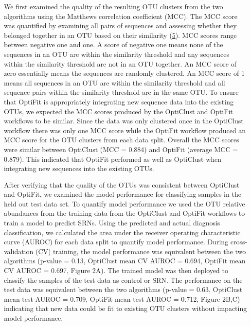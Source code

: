 \documentclass[
]{article}
\begin{document}
We first examined the quality of the resulting OTU clusters from the two
algorithms using the Matthews correlation coefficient (MCC). The MCC
score was quantified by examining all pairs of sequences and assessing
whether they belonged together in an OTU based on their similarity
(\protect\hyperlink{ref-westcott2017}{5}). MCC scores range between
negative one and one. A score of negative one means none of the
sequences in an OTU are within the similarity threshold and any
sequences within the similarity threshold are not in an OTU together. An
MCC score of zero essentially means the sequences are randomly
clustered. An MCC score of 1 means all sequences in an OTU are within
the similarity threshold and all sequence pairs within the similarity
threshold are in the same OTU. To ensure that OptiFit is appropriately
integrating new sequence data into the existing OTUs, we expected the
MCC scores produced by the OptiClust and OptiFit workflows to be
similar. Since the data was only clustered once in the OptiClust
workflow there was only one MCC score while the OptiFit workflow
produced an MCC score for the OTU clusters from each data split. Overall
the MCC scores were similar between OptiClust (MCC = 0.884) and OptiFit
(average MCC = 0.879). This indicated that OptiFit performed as well as
OptiClust when integrating new sequences into the existing OTUs.

After verifying that the quality of the OTUs was consistent between
OptiClust and OptiFit, we examined the model performance for classifying
samples in the held out test data set. To quantify model performance we
used the OTU relative abundances from the training data from the
OptiClust and OptiFit workflows to train a model to predict SRNs. Using
the predicted and actual diagnosis classification, we calculated the
area under the receiver operating characteristic curve (AUROC) for each
data split to quantify model performance. During cross-validation (CV)
training, the model performance was equivalent between the two
algorithms (p-value = 0.13, OptiClust mean CV AUROC = 0.694, OptiFit
mean CV AUROC = 0.697, Figure 2A). The trained model was then deployed
to classify the samples of the test data as control or SRN. The
performance on the test data was equivalent between the two algorithms
(p-value = 0.63, OptiClust mean test AUROC = 0.709, OptiFit mean test
AUROC = 0.712, Figure 2B,C) indicating that new data could be fit to
existing OTU clusters without impacting model performance.
\end{document}
